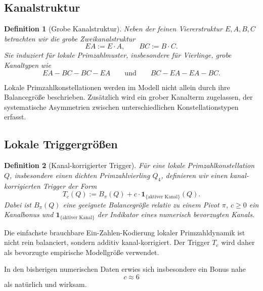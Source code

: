 \documentclass[11pt,a4paper]{article}
\newtheorem{definition}{Definition}[section]
\begin{document}
	\subsection{Kanalstruktur}
	
	\begin{definition}[Grobe Kanalstruktur]
		\label{def:modell_kanal}
		Neben der feinen Viererstruktur \(E,A,B,C\) betrachten wir die grobe Zweikanalstruktur
		\[
		EA:=E\cdot A,\qquad BC:=B\cdot C.
		\]
		Sie induziert für lokale Primzahlmuster, insbesondere für Vierlinge, grobe Kanaltypen wie
		\[
		EA-BC-BC-EA
		\qquad\text{und}\qquad
		BC-EA-EA-BC.
		\]
	\end{definition}
	
	\begin{axiom}[Kanalkorrektur]
		\label{ax:kanalkorrektur}
		Lokale Primzahlkonstellationen werden im Modell nicht allein durch ihre Balancegröße beschrieben. Zusätzlich wird ein grober Kanalterm zugelassen, der systematische Asymmetrien zwischen unterschiedlichen Konstellationstypen erfasst.
	\end{axiom}
	
	\subsection{Lokale Triggergrößen}
	
	\begin{definition}[Kanal-korrigierter Trigger]
		\label{def:modell_trigger}
		Für eine lokale Primzahlkonstellation \(Q\), insbesondere einen dichten Primzahlvierling \(Q_4\), definieren wir einen kanal-korrigierten Trigger der Form
		\[
		T_c(Q):=B_\pi(Q)+c\cdot \mathbf{1}_{\{\text{aktiver Kanal}\}}(Q).
		\]
		Dabei ist \(B_\pi(Q)\) eine geeignete Balancegröße relativ zu einem Pivot \(\pi\), \(c\ge 0\) ein Kanalbonus und \(\mathbf{1}_{\{\text{aktiver Kanal}\}}\) der Indikator eines numerisch bevorzugten Kanals.
	\end{definition}
	
	\begin{axiom}
		\label{ax:triggerform}
		Die einfachste brauchbare Ein-Zahlen-Kodierung lokaler Primzahldynamik ist nicht rein balanciert, sondern additiv kanal-korrigiert. Der Trigger \(T_c\) wird daher als bevorzugte empirische Modellgröße verwendet.
	\end{axiom}
	
	\begin{bemerkung}
		In den bisherigen numerischen Daten erwies sich insbesondere ein Bonus nahe
		\[
		c\approx 6
		\]
		als natürlich und wirksam.
	\end{bemerkung}
	
\end{document}
